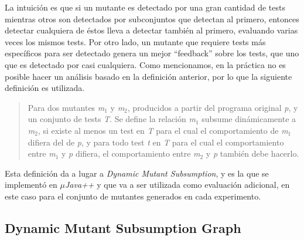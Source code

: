 La intuici\'on es que si un mutante es detectado por una gran cantidad de tests mientras otros son detectados por subconjuntos que detectan al primero, entonces detectar cualquiera de \'estos lleva a detectar tambi\'en al primero, evaluando varias veces los mismos tests. Por otro lado, un mutante que requiere tests m\'as espec\'ificos para ser detectado genera un mejor ``feedback'' sobre los tests, que uno que es detectado por casi cualquiera. Como mencionamos, en la pr\'actica no es posible hacer un an\'alisis basado en la definici\'on anterior, por lo que la siguiente definici\'on es utilizada.
\begin{quote}
	Para dos mutantes \emph{m$_1$} y \emph{m$_2$}, producidos a partir del programa original \emph{p}, y un conjunto de tests \emph{T}. Se define la relaci\'on \emph{m$_1$} subsume din\'amicamente a \emph{m$_2$}, si existe al menos un test en \emph{T} para el cual el comportamiento de \emph{m$_1$} difiera del de \emph{p}, y para todo test \emph{t} en \emph{T} para el cual el comportamiento entre \emph{m$_1$} y \emph{p} difiera, el comportamiento entre \emph{m$_2$} y \emph{p} tambi\'en debe hacerlo.
\end{quote}
Esta definici\'on da a lugar a \emph{Dynamic Mutant Subsumption}, y es la que se implement\'o en \emph{$\mu$Java++} y que va a ser utilizada como evaluaci\'on adicional, en este caso para el conjunto de mutantes generados en cada experimento.

\subsection{Dynamic Mutant Subsumption Graph}
\label{sec:implementation.dynamicSubsumption.graph}

